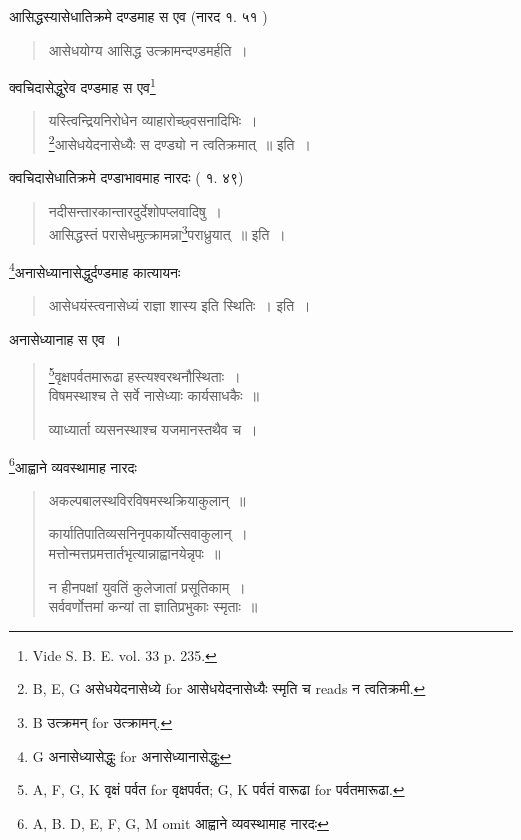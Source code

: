 \documentclass[11pt, openany]{book}
\begin{document}
आसिद्धस्यासेधातिक्रमे दण्डमाह स एव (नारद १. ५१ ) 

\begin{quote}
{\vy आसेधयोग्य आसिद्ध उत्क्रामन्दण्डमर्हति~।}
\end{quote}

\newpage
{}

क्वचिदासेद्धुरेव दण्डमाह स एव\renewcommand{\thefootnote}{1}\footnote{Vide S. B. E. vol. 33 p. 235.}

\begin{quote}
{\vy यस्त्विन्द्रियनिरोधेन व्याहारोच्छ्वसनादिभिः~।\\
\renewcommand{\thefootnote}{2}\footnote{B, E, G असेधयेदनासेध्ये for आसेधयेदनासेध्यैः स्मृति च reads न त्वतिक्रमी.}आसेधयेदनासेध्यैः स दण्ड्यो न त्वतिक्रमात्~॥} इति~।
\end{quote}

क्वचिदासेधातिक्रमे दण्डाभावमाह नारदः ( १. ४९)

\begin{quote}
{\vy नदीसन्तारकान्तारदुर्देशोपप्लवादिषु~।\\
आसिद्धस्तं परासेधमुत्क्रामन्ना\renewcommand{\thefootnote}{3}\footnote{B उत्क्रमन् for उत्क्रामन्.}पराध्रुयात्~॥} इति~।
\end{quote}

\renewcommand{\thefootnote}{4}\footnote{G अनासेध्यासेद्धुः for अनासेध्यानासेद्धुः}अनासेध्यानासेद्धुर्दण्डमाह कात्यायनः 

\begin{quote}
{\vy आसेधयंस्त्वनासेध्यं राज्ञा शास्य इति स्थितिः~।} इति~।
\end{quote}

अनासेध्यानाह स एव~। 

\begin{quote}
{\vy \renewcommand{\thefootnote}{5}\footnote{A, F, G, K वृक्षं पर्वत for वृक्षपर्वत; G, K पर्वतं वारूढा for पर्वतमारूढा.}वृक्षपर्वतमारूढा हस्त्यश्वरथनौस्थिताः~।\\
विषमस्थाश्च ते सर्वे नासेध्याः कार्यसाधकैः~॥

व्याध्यार्ता व्यसनस्थाश्च यजमानस्तथैव च~।}
\end{quote}

\renewcommand{\thefootnote}{6}\footnote{A, B. D, E, F, G, M omit आह्वाने व्यवस्थामाह नारदः}आह्वाने व्यवस्थामाह नारदः

\begin{quote}
{\vy अकल्पबालस्थविरविषमस्थक्रियाकुलान्~॥ 

कार्यातिपातिव्यसनिनृपकार्योत्सवाकुलान्~।\\
मत्तोन्मत्तप्रमत्तार्तभृत्यान्नाह्वानयेन्नृपः~॥

न हीनपक्षां युवतिं कुलेजातां प्रसूतिकाम्~।\\
सर्ववर्णोत्तमां कन्यां ता ज्ञातिप्रभुकाः स्मृताः~॥}
\end{quote}
\end{document}
